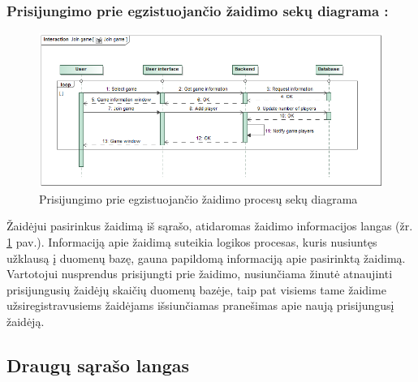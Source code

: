 \documentclass{VUMIFPSkursinis}
\begin{document}
		\subsubsection*{Prisijungimo prie egzistuojančio žaidimo sekų diagrama :}
			\begin{figure}[H]
				\centering
				\includegraphics[scale=0.5]{img/JoinGame_sequence}
				\caption{Prisijungimo prie egzistuojančio žaidimo procesų sekų diagrama}
				\label{img:JoinGame_sequence}
			\end{figure}
			Žaidėjui pasirinkus žaidimą iš sąrašo, atidaromas žaidimo informacijos 
			langas (žr. \ref{img:JoinGame_sequence} pav.). Informaciją apie žaidimą suteikia logikos procesas, kuris
			nusiuntęs užklausą į duomenų bazę, gauna papildomą informaciją apie 
			pasirinktą žaidimą. Vartotojui nusprendus prisijungti prie žaidimo, 
			nusiunčiama žinutė atnaujinti prisijungusių žaidėjų skaičių duomenų bazėje,
			taip pat visiems tame žaidime užsiregistravusiems žaidėjams išsiunčiamas 
			pranešimas apie naują prisijungusį žaidėją.

	\subsection{Draugų sąrašo langas}		
\end{document}
